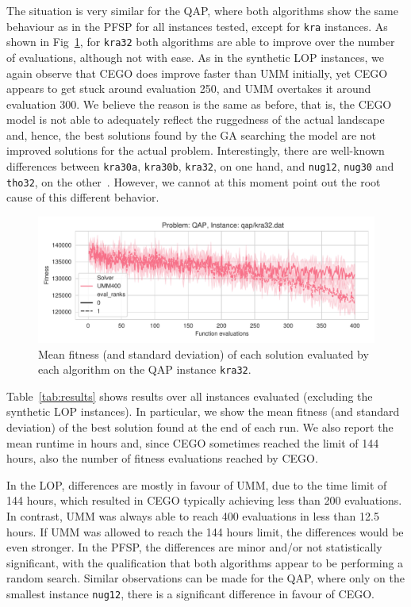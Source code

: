 \documentclass[sigconf,dvipsnames]{acmart}
\begin{document}
The situation is very similar for the QAP, where both algorithms show the same
behaviour as in the PFSP for all instances tested, except for
\texttt{kra} instances. As shown in Fig~\ref{fig:kra32}, for \texttt{kra32} both
algorithms are able to improve over the number of evaluations, although not
with ease. As in the synthetic LOP instances, we again observe that CEGO does
improve faster than UMM initially, yet CEGO appears to get stuck around
evaluation 250, and UMM overtakes it around evaluation 300. We believe the
reason is the same as before, that is, the CEGO model is not able to adequately
reflect the ruggedness of the actual landscape and, hence, the best solutions
found by the GA searching the model are not improved solutions for the actual
problem. Interestingly, there are well-known differences between
\texttt{kra30a}, \texttt{kra30b}, \texttt{kra32}, on one hand, and \texttt{nug12}, \texttt{nug30} and
\texttt{tho32}, on the other~\citep{AnsBriGou2002qap}. However, we cannot at
this moment point out the root cause of this different behavior.

\begin{figure}[tp]
  \centering%
  \includegraphics[width=\textwidth]{../img/fitness_real_qap_kra32_dat}
  \caption{Mean fitness  (and standard deviation)  of each solution evaluated by each algorithm on the QAP instance \texttt{kra32}.\label{fig:kra32}}
  \vspace*{-1em}
\end{figure}

Table~\ref{tab:results} shows results over all instances evaluated (excluding
the synthetic LOP instances). In particular, we show the mean fitness (and
standard deviation) of the best solution found at the end of each run. We also report the mean runtime in hours and, since CEGO sometimes reached the limit of 144 hours, also the number of fitness evaluations reached by CEGO.

In the LOP, differences are mostly in favour of UMM, due to the time limit of
144 hours, which resulted in CEGO typically achieving less than 200
evaluations. In contrast, UMM was always able to reach 400 evaluations in less
than 12.5 hours. If UMM was allowed to reach the 144 hours limit, the differences
would be even stronger.
%
In the PFSP, the differences are minor and/or not statistically
significant, with the qualification that both algorithms appear to be
performing a random search. Similar observations can be made for the QAP, where
only on the smallest instance \texttt{nug12}, there is a significant difference
in favour of CEGO.
\end{document}
